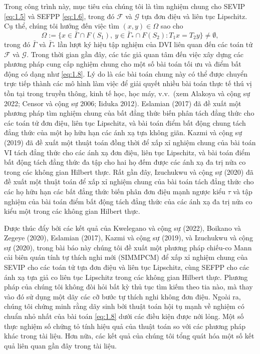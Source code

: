 \documentclass[11pt,a4paper]{article}
\theoremstyle{plain}
\theoremstyle{definition}
\theoremstyle{remark}
\numberwithin{equation}{section}
\newcommand{\Fc}{\mathcal{F}}
\newcommand{\Gc}{\mathcal{G}}
\newcommand{\Gam}{\bar{\Gamma}}
\newcommand{\Gams}{\bar{\Gamma}_{*}}
\newcommand{\Fix}[1]{F(#1)}
\begin{document}
Trong công trình này, mục tiêu của chúng tôi là tìm nghiệm chung cho SEVIP \eqref{eq:1.5} và SEFPP \eqref{eq:1.6}, trong đó $\Fc$ và $\Gc$ tựa đơn điệu và liên tục Lipschitz. Cụ thể, chúng tôi hướng đến việc tìm $(x,y)\in\Omega$ sao cho
\begin{equation}
\Omega := \{x\in\Gam\cap \Fix{S_1},\ y\in\Gams\cap \Fix{S_2}:T_1x=T_2y\}\ne\emptyset, \label{eq:1.8}
\end{equation}
trong đó $\Gam$ và $\Gams$ lần lượt ký hiệu tập nghiệm của DVI liên quan đến các toán tử $\Fc$ và $\Gc$. Trong thời gian gần đây, các tác giả quan tâm đến việc xây dựng các phương pháp cung cấp nghiệm chung cho một số bài toán tối ưu và điểm bất động có dạng như \eqref{eq:1.8}. Lý do là các bài toán chung này có thể được chuyển trực tiếp thành các mô hình làm việc để giải quyết nhiều bài toán thực tế thú vị tồn tại trong truyền thông, kinh tế học, học máy, v.v.\ (xem Alakoya và cộng sự 2022; Censor và cộng sự 2006; Iiduka 2012). Eslamian (2017) đã đề xuất một phương pháp tìm nghiệm chung của bất đẳng thức biến phân tách đẳng thức cho các toán tử đơn điệu, liên tục Lipschitz, và bài toán điểm bất động chung tách đẳng thức của một họ hữu hạn các ánh xạ tựa không giãn. Kazmi và cộng sự (2019) đã đề xuất một thuật toán đồng thời để xấp xỉ nghiệm chung của bài toán VI tách đẳng thức cho các ánh xạ đơn điệu, liên tục Lipschitz, và bài toán điểm bất động tách đẳng thức đa tập cho hai họ đếm được các ánh xạ đa trị nửa co trong các không gian Hilbert thực. Rất gần đây, Izuchukwu và cộng sự (2020) đã đề xuất một thuật toán để xấp xỉ nghiệm chung của bài toán tách đẳng thức cho các họ hữu hạn các bất đẳng thức biến phân đơn điệu mạnh ngược kiểu $\tau$ và tập nghiệm của bài toán điểm bất động tách đẳng thức của các ánh xạ đa trị nửa co kiểu một trong các không gian Hilbert thực.

Được thúc đẩy bởi các kết quả của Kwelegano và cộng sự (2022), Boikano và Zegeye (2020), Eslamian (2017), Kazmi và cộng sự (2019), và Izuchukwu và cộng sự (2020), trong bài báo này chúng tôi đề xuất một phương pháp chiếu-co Mann cải biên quán tính tự thích nghi mới (SIMMPCM) để xấp xỉ nghiệm chung của SEVIP cho các toán tử tựa đơn điệu và liên tục Lipschitz, cùng SEFPP cho các ánh xạ tựa giả co liên tục Lipschitz trong các không gian Hilbert thực. Phương pháp của chúng tôi không đòi hỏi bất kỳ thủ tục tìm kiếm theo tia nào, mà thay vào đó sử dụng một dãy các cỡ bước tự thích nghi không đơn điệu. Ngoài ra, chúng tôi chứng minh rằng dãy sinh bởi thuật toán hội tụ mạnh về nghiệm có chuẩn nhỏ nhất của bài toán \eqref{eq:1.8} dưới các điều kiện được nới lỏng. Một số thực nghiệm số chứng tỏ tính hiệu quả của thuật toán so với các phương pháp khác trong tài liệu. Hơn nữa, các kết quả của chúng tôi tổng quát hóa một số kết quả liên quan gần đây trong tài liệu.
\end{document}
